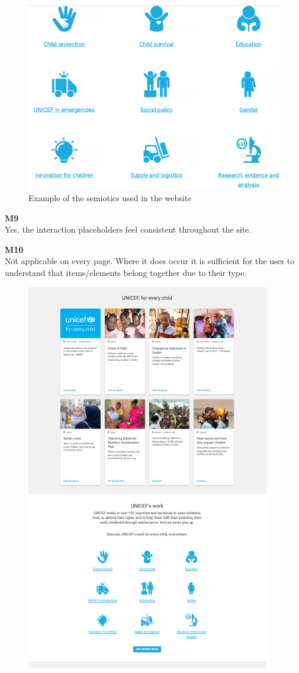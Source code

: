 \begin{description}
\begin{figure}[h]
        \includegraphics[scale=1.0]{Resources/Harry/Harry_M8.png}
        \caption{Example of the semiotics used in the website}
    \end{figure}
    \item {\textbf{M9} \color{unicefGray}{Interaction placeholder consistency}}\\
    Yes, the interaction placeholders feel consistent throughout the site. 
    \item {\textbf{M10} \color{unicefGray}{Spatial allocation}}\\
    Not applicable on every page. Where it does occur it is sufficient for the user to understand that items/elements belong together due to their type.
    \begin{figure}[h]
        \centering
        \includegraphics[scale=1.0]{Resources/Harry/Harry_M10.png}

\end{figure}
\end{description}

